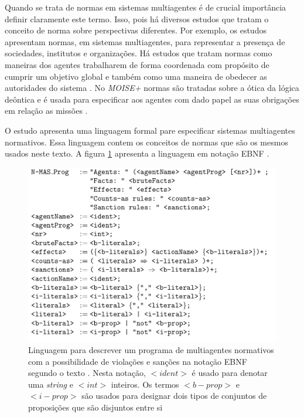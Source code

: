 Quando se trata de normas em sistemas multiagentes é de crucial importância definir claramente este termo. Isso, pois há diversos estudos que tratam o conceito de norma sobre perspectivas diferentes. Por exemplo, os estudos \cite{formalizeagent} \cite{formalizeagent2} apresentam normas, em sistemas multiagentes, para representar a presença de sociedades, institutos e organizações. Há estudos que tratam normas como maneiras dos agentes trabalharem de forma coordenada com propósito de cumprir um objetivo global e também como uma maneira de obedecer as autoridades do sistema \cite{modelingnormsforautnomousagent} \cite{amodelmultiagentsystemdynamicrelationship}. No \textit{MOISE+} normas são tratadas sobre a ótica da lógica deôntica e é usada para especificar aos agentes com dado papel as suas obrigações em relação as missões \cite{moiseframework} \cite{moiseframeworktwo}.

O estudo \cite{dastaniframework} apresenta uma linguagem formal pare especificar sistemas multiagentes normativos. Essa linguagem contem os conceitos de normas que são os mesmos usados neste texto. A figura \ref{descreveprograma} apresenta a linguagem em notação EBNF \cite{dastaniframework}.

\begin{figure}[H]
  \centering
  \includegraphics[width=0.8\linewidth]{figure/masprogram.png} 
  \caption{Linguagem para descrever um programa de multiagentes normativos com a possibilidade de violações e sanções na notação EBNF segundo o texto \cite{dastaniframework}. Nesta notação, $<ident>$ é usado para denotar uma \textit{string} e $<int>$ inteiros. Os termos $<b-prop>$ e $<i-prop>$ são usados para designar dois tipos de conjuntos de proposições que são disjuntos entre si}
  \label{descreveprograma}
\end{figure}

